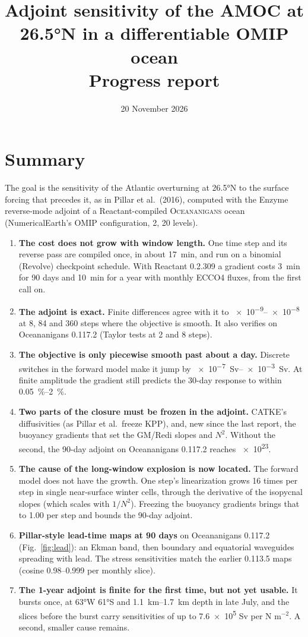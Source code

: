 \documentclass[10pt]{article}
\title{\vspace{-2em}\textbf{Adjoint sensitivity of the AMOC at \ang{26.5}N in a differentiable OMIP ocean}\\[2pt]
       \large Progress report\vspace{-0.4em}}
\date{20 November 2026\vspace{-1em}}
\begin{document}
\maketitle

\section{Summary}

The goal is the sensitivity of the Atlantic overturning at \ang{26.5}N to the surface forcing that precedes it,
as in Pillar et al.\ (2016), computed with the Enzyme reverse-mode adjoint of a Reactant-compiled
\textsc{Oceananigans} ocean (NumericalEarth's OMIP configuration, 2\textdegree, 20 levels).
\begin{enumerate}
  \item \textbf{The cost does not grow with window length.} One time step and its reverse pass are compiled once,
        in about \SI{17}{min}, and run on a binomial (Revolve) checkpoint schedule. With Reactant 0.2.309 a gradient
        costs \SI{3}{min} for 90 days and \SI{10}{min} for a year with monthly ECCO4 fluxes, from the first call on.
  \item \textbf{The adjoint is exact.} Finite differences agree with it to \numrange{e-9}{e-8} at 8, 84 and 360
        steps where the objective is smooth. It also verifies on Oceananigans 0.117.2 (Taylor tests at 2 and 8 steps).
  \item \textbf{The objective is only piecewise smooth past about a day.} Discrete switches in the forward model
        make it jump by \SIrange{e-7}{e-3}{Sv}. At finite amplitude the gradient still predicts the 30-day response
        to within \SIrange{0.05}{2}{\percent}.
  \item \textbf{Two parts of the closure must be frozen in the adjoint.} CATKE's diffusivities (as Pillar et al.\
        freeze KPP), and, new since the last report, the buoyancy gradients that set the GM/Redi slopes and $N^2$.
        Without the second, the 90-day adjoint on Oceananigans 0.117.2 reaches \num{e23}.
  \item \textbf{The cause of the long-window explosion is now located.} The forward model does not have the
        growth. One step's linearization grows 16 times per step in single near-surface winter cells, through the
        derivative of the isopycnal slopes (which scales with $1/N^2$). Freezing the buoyancy gradients brings
        that to 1.00 per step and bounds the 90-day adjoint.
  \item \textbf{Pillar-style lead-time maps at 90 days} on Oceananigans 0.117.2 (Fig.~\ref{fig:lead}): an Ekman
        band, then boundary and equatorial waveguides spreading with lead. The stress sensitivities match the
        earlier 0.113.5 maps (cosine 0.98--0.999 per monthly slice).
  \item \textbf{The 1-year adjoint is finite for the first time, but not yet usable.} It bursts once, at
        \ang{63}W \ang{61}S and \SIrange{1.1}{1.7}{km} depth in late July, and the slices before the burst carry
        sensitivities of up to \num{7.6e5} Sv per N m$^{-2}$. A second, smaller cause remains.
\end{enumerate}
\end{document}
